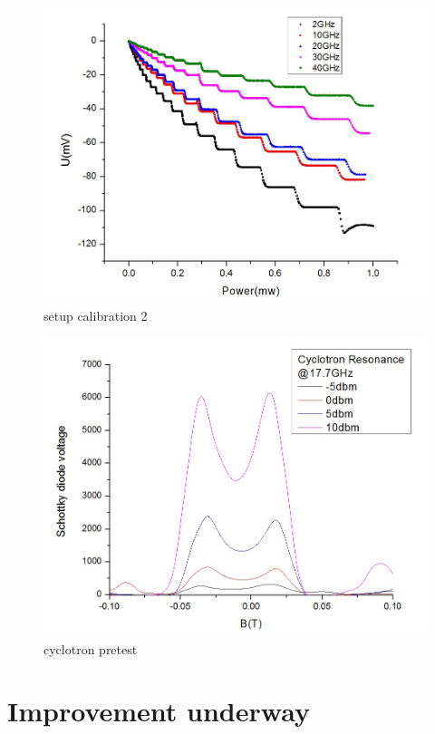 \documentclass[12pt]{ruthesis}
\begin{document}
\begin{figure}
  \centering
  \includegraphics[totalheight=8cm]{figures/multifre.JPG}
  \caption{setup calibration 2}
  \label{multifre}
\end{figure}
 

\begin{figure}
  \centering
  \includegraphics[totalheight=8cm]{figures/CRpowerdep.JPG}
  \caption{cyclotron pretest}
  \label{crpowerdep}
\end{figure}
 







\section{Improvement underway}\label{Improvement}
\end{document}
